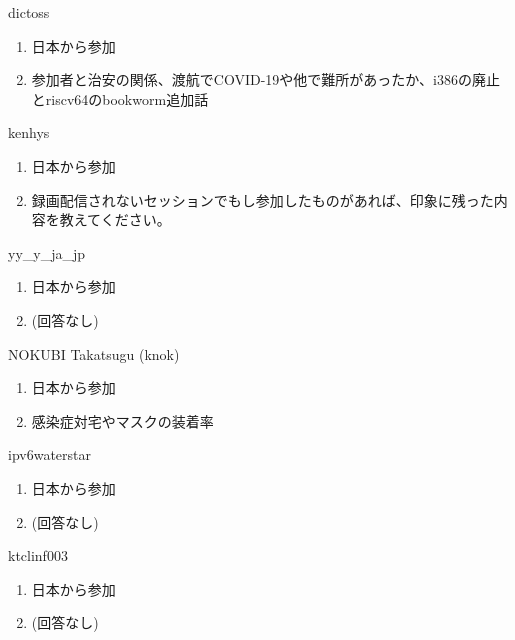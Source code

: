 \begin{prework}{ dictoss }
  \begin{enumerate}
  \item 日本から参加
  \item 参加者と治安の関係、渡航でCOVID-19や他で難所があったか、i386の廃止とriscv64のbookworm追加話
  \end{enumerate}
\end{prework}

\begin{prework}{ kenhys }
  \begin{enumerate}
  \item 日本から参加
  \item 録画配信されないセッションでもし参加したものがあれば、印象に残った内容を教えてください。
  \end{enumerate}
\end{prework}

\begin{prework}{ yy\_y\_ja\_jp }
  \begin{enumerate}
  \item 日本から参加
  \item (回答なし)
  \end{enumerate}
\end{prework}

\begin{prework}{ NOKUBI Takatsugu (knok) }
  \begin{enumerate}
  \item 日本から参加
  \item 感染症対宅やマスクの装着率
  \end{enumerate}
\end{prework}

\begin{prework}{ ipv6waterstar }
  \begin{enumerate}
  \item 日本から参加
  \item (回答なし)
  \end{enumerate}
\end{prework}

\begin{prework}{ ktclinf003 }
  \begin{enumerate}
  \item 日本から参加
  \item (回答なし)
  \end{enumerate}
\end{prework}

